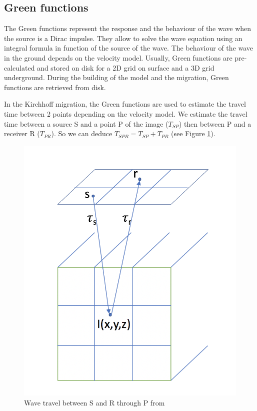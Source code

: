 \subsection{Green functions}
The Green functions represent the response and the behaviour of the wave when the source is a Dirac impulse.
They allow to solve the wave equation using an integral formula in function of the source of the wave.
The behaviour of the wave in the ground depends on the velocity model.
Usually, Green functions are pre-calculated and stored on disk for a 2D grid on surface and a 3D grid underground.
During the building of the model and the migration, Green functions are retrieved from disk.

In the Kirchhoff migration, the Green functions are used to estimate the travel time between 2 points depending on the velocity model.
We estimate the travel time between a source S and a point P of the image ($T_{SP}$) then between P and a receiver R ($T_{PR}$).
So we can deduce $T_{SPR} = T_{SP} + T_{PR}$ (see Figure \ref{fig:Green_functions1}).

\begin{figure}[H]
	\centering
	\includegraphics[scale=0.6]{img1}
	\caption{Wave travel between S and R through P\label{fig:Green_functions1} from \cite{rapport_Total_Petiton}}
\end{figure}

